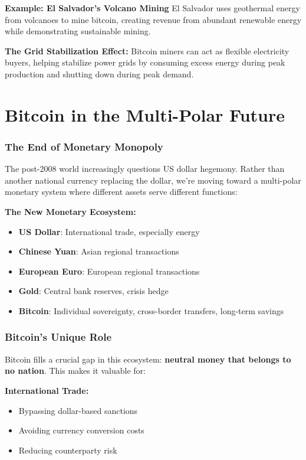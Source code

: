 \documentclass[11pt,oneside]{book}
\begin{document}
\textbf{Example: El Salvador's Volcano Mining}
El Salvador uses geothermal energy from volcanoes to mine bitcoin, creating revenue from abundant renewable energy while demonstrating sustainable mining.

\textbf{The Grid Stabilization Effect:}
Bitcoin miners can act as flexible electricity buyers, helping stabilize power grids by consuming excess energy during peak production and shutting down during peak demand.

\section{Bitcoin in the Multi-Polar Future}

\subsubsection{The End of Monetary Monopoly}

The post-2008 world increasingly questions US dollar hegemony. Rather than another national currency replacing the dollar, we're moving toward a multi-polar monetary system where different assets serve different functions:

\textbf{The New Monetary Ecosystem:}
\begin{itemize}
\item \textbf{US Dollar}: International trade, especially energy
\item \textbf{Chinese Yuan}: Asian regional transactions
\item \textbf{European Euro}: European regional transactions
\item \textbf{Gold}: Central bank reserves, crisis hedge
\item \textbf{Bitcoin}: Individual sovereignty, cross-border transfers, long-term savings
\end{itemize}

\subsubsection{Bitcoin's Unique Role}

Bitcoin fills a crucial gap in this ecosystem: \textbf{neutral money that belongs to no nation}. This makes it valuable for:

\textbf{International Trade:}
\begin{itemize}
\item Bypassing dollar-based sanctions
\item Avoiding currency conversion costs
\item Reducing counterparty risk
\end{itemize}
\end{document}
